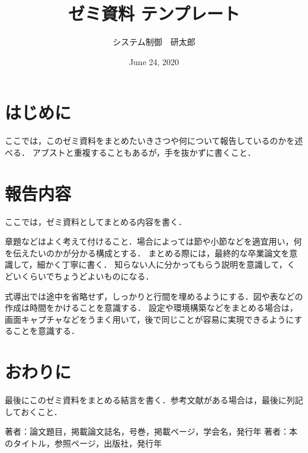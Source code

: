 \documentclass[a4paper]{jarticle}
\title{ゼミ資料 テンプレート}
\author{システム制御　研太郎}
\date{June 24, 2020}
\begin{document}
\maketitle
%
\section{はじめに}
%
ここでは，このゼミ資料をまとめたいきさつや何について報告しているのかを述べる．
アブストと重複することもあるが，手を抜かずに書くこと．
%
\section{報告内容}
%
ここでは，ゼミ資料としてまとめる内容を書く．

章題などはよく考えて付けること．場合によっては節や小節などを適宜用い，何を伝えたいのかが分かる構成とする．
まとめる際には，最終的な卒業論文を意識して，細かく丁寧に書く．
知らない人に分かってもらう説明を意識して，くどいくらいでちょうどよいものになる．

式導出では途中を省略せず，しっかりと行間を埋めるようにする．図や表などの作成は時間をかけることを意識する．
設定や環境構築などをまとめる場合は，画面キャプチャなどをうまく用いて，後で同じことが容易に実現できるようにすることを意識する．
%
%
\section{おわりに}
%
最後にこのゼミ資料をまとめる結言を書く．参考文献がある場合は，最後に列記しておくこと．
%
\begin{thebibliography}{99}
    著者：論文題目，掲載論文誌名，号巻，掲載ページ，学会名，発行年
    著者：本のタイトル，参照ページ，出版社，発行年
\end{thebibliography}
%
\end{document}
